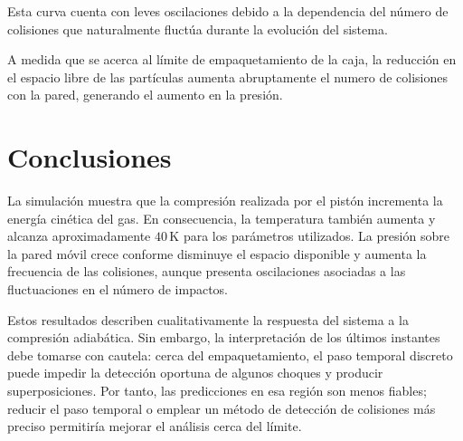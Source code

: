 \documentclass[12pt,a4paper]{article}
\begin{document}
Esta curva cuenta con leves oscilaciones debido a la dependencia del número de colisiones que naturalmente fluctúa durante la evolución del sistema.

A medida que se acerca al límite de empaquetamiento de la caja, la reducción en el espacio libre de las partículas aumenta abruptamente el numero de colisiones con la pared, generando el aumento en la presión.

\section{Conclusiones}

La simulación muestra que la compresión realizada por el pistón incrementa la energía cinética del gas. En consecuencia, la temperatura también aumenta y alcanza aproximadamente $40\,\mathrm{K}$ para los parámetros utilizados. La presión sobre la pared móvil crece conforme disminuye el espacio disponible y aumenta la frecuencia de las colisiones, aunque presenta oscilaciones asociadas a las fluctuaciones en el número de impactos.

Estos resultados describen cualitativamente la respuesta del sistema a la compresión adiabática. Sin embargo, la interpretación de los últimos instantes debe tomarse con cautela: cerca del empaquetamiento, el paso temporal discreto puede impedir la detección oportuna de algunos choques y producir superposiciones. Por tanto, las predicciones en esa región son menos fiables; reducir el paso temporal o emplear un método de detección de colisiones más preciso permitiría mejorar el análisis cerca del límite.

\renewcommand{\refname}{Referencias}


\end{document}
